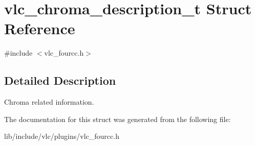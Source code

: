 \hypertarget{structvlc__chroma__description__t}{}\section{vlc\+\_\+chroma\+\_\+description\+\_\+t Struct Reference}
\label{structvlc__chroma__description__t}


{\ttfamily \#include $<$vlc\+\_\+fourcc.\+h$>$}



\subsection{Detailed Description}
Chroma related information. 

The documentation for this struct was generated from the following file\+:\begin{DoxyCompactItemize}
\item 
lib/include/vlc/plugins/vlc\+\_\+fourcc.\+h\end{DoxyCompactItemize}
